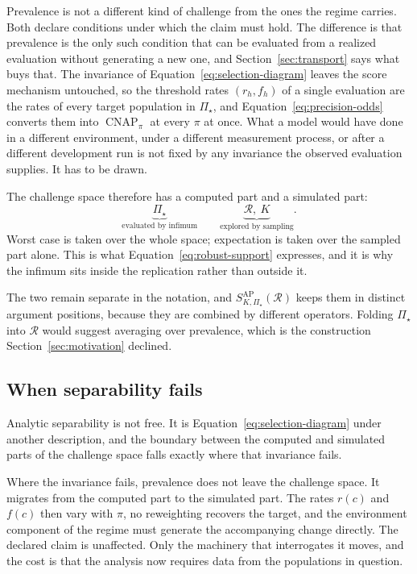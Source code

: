 \documentclass[11pt]{article}
\newcommand{\CNAP}{\operatorname{CNAP}}
\newcommand{\Regime}{\mathcal{R}}
\newcommand{\PSet}{\Pi_\star}
\theoremstyle{remark}
\begin{document}
Prevalence is not a different kind of challenge from the ones the regime carries. Both declare conditions under which the claim must hold. The difference is that prevalence is the only such condition that can be evaluated from a realized evaluation without generating a new one, and Section~\ref{sec:transport} says what buys that. The invariance of Equation~\eqref{eq:selection-diagram} leaves the score mechanism untouched, so the threshold rates $(r_h,f_h)$ of a single evaluation are the rates of every target population in $\PSet$, and Equation~\eqref{eq:precision-odds} converts them into $\CNAP_\pi$ at every $\pi$ at once. What a model would have done in a different environment, under a different measurement process, or after a different development run is not fixed by any invariance the observed evaluation supplies. It has to be drawn.

The challenge space therefore has a computed part and a simulated part:
\[
\underbrace{\PSet}_{\text{evaluated by infimum}}
\qquad
\underbrace{\Regime,\ K}_{\text{explored by sampling}}.
\]
Worst case is taken over the whole space; expectation is taken over the sampled part alone. This is what Equation~\eqref{eq:robust-support} expresses, and it is why the infimum sits inside the replication rather than outside it.

The two remain separate in the notation, and $S_{K,\PSet}^{\mathrm{AP}}(\Regime)$ keeps them in distinct argument positions, because they are combined by different operators. Folding $\PSet$ into $\Regime$ would suggest averaging over prevalence, which is the construction Section~\ref{sec:motivation} declined.

\subsection{When separability fails}
\label{sec:separability}

Analytic separability is not free. It is Equation~\eqref{eq:selection-diagram} under another description, and the boundary between the computed and simulated parts of the challenge space falls exactly where that invariance fails.

Where the invariance fails, prevalence does not leave the challenge space. It migrates from the computed part to the simulated part. The rates $r(c)$ and $f(c)$ then vary with $\pi$, no reweighting recovers the target, and the environment component of the regime must generate the accompanying change directly. The declared claim is unaffected. Only the machinery that interrogates it moves, and the cost is that the analysis now requires data from the populations in question.
\end{document}
